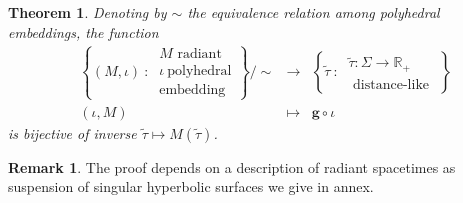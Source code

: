 \documentclass[a4paper,12pt]{article}
\def\RR{\mathbb{R}}
\def\quadform{\mathbf{g}}
\newcommand{\functionn}[4]{\displaystyle\begin{array}{l|rcl}
& \displaystyle #1 & \longrightarrow & \displaystyle #2 \\
	& \displaystyle #3 & \longmapsto & \displaystyle #4 \end{array}}
\newtheorem{theo}{Theorem}	%
\theoremstyle{definition}
\newtheorem*{rem}{Remark}			 %
\begin{document}
					\begin{theo}\label{theo:time_carac}
					Denoting by $\sim$ the equivalence relation among polyhedral embeddings, the function
					 $$ \functionn{ \left\{(M,\iota) ~:~ \begin{array}{c}
					 M \text{ radiant}\\
												 \iota~\text{polyhedral} \\ \text{embedding} 
												 \end{array}
\right\}/\sim }{ \left\{ \widetilde\tau ~:~\begin{array}{c}
												 \widetilde\tau: \Sigma\rightarrow \RR_+ \\ \text{ distance-like }
												 \end{array}\right\} }{(\iota,M)}{\quadform\circ \iota }$$
					is bijective of inverse $\widetilde\tau \mapsto M(\widetilde\tau)$.
					
					\end{theo}
					\begin{rem}\label{rem:proof_depends_description_radiant}
					 The proof depends on a description of radiant spacetimes as suspension of singular hyperbolic surfaces we give in annex.
					\end{rem}
\end{document}
